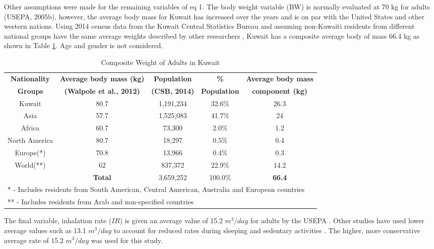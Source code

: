 Other assumptions were made for the remaining variables of eq 1. The body weight variable (BW) is normally evaluated at 70 kg for adults (USEPA, 2005b), however, the average body mass for Kuwait has increased over the years and is on par with the United States and other western nations. Using 2014 census data from the Kuwait Central Statistics Bureau and assuming non-Kuwaiti residents from different national groups have the same average weights described by other researchers \citep{Walpole2012}, Kuwait has a composite average body of mass 66.4 kg as shown in Table \ref{tb:4compositewght}. Age and gender is not considered.
%
\begin{table}[!htb]
\centering
\caption{Composite Weight of Adults in Kuwait}
\label{tb:4compositewght}
\begin{adjustbox}{width=1\textwidth}
\begin{tabular}{ccccc}
\toprule
\textbf{Nationality} & \textbf{Average body mass (kg)} & \textbf{Population} & \textbf{\%} & \textbf{Average body mass} \\ 
\textbf{Groups} & \textbf{(Walpole et al., 2012)} & \textbf{(CSB, 2014)} & \textbf{Population} & \textbf{component (kg)} \\ \midrule
Kuwait & 80.7 & 1,191,234 & 32.6\% & 26.3 \\
Asia & 57.7 & 1,525,083 & 41.7\% & 24 \\
Africa & 60.7 & 73,300 & 2.0\% & 1.2 \\
North America & 80.7 & 18,297 & 0.5\% & 0.4 \\
Europe(*) & 70.8 & 13,966 & 0.4\% & 0.3 \\
World(**) & 62 & 837,372 & 22.9\% & 14.2 \\
 & \textbf{Total} & 3,659,252 & 100.0\% & \textbf{66.4} \\ \bottomrule
\multicolumn{5}{l}{* - Includes residents from South American, Central American, Australia and European countries} \\
\multicolumn{5}{l}{** - Includes residents from Arab and non-specified countries}
\end{tabular}
\end{adjustbox}
\end{table}
%
The final variable, inhalation rate ($IR$) is given an average value of 15.2 $m^{3}/day$ for adults by the USEPA \citep{USEPA2005b}. Other studies have used lower average values such as 13.1 $m^{3}/day$ to account for reduced rates during sleeping and sedentary activities \citep{Marshall2006}. The higher, more conservative average rate of 15.2 $m^{3}/day$ was used for this study. 

